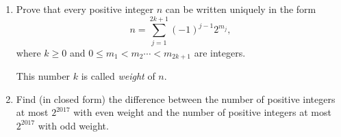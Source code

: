\begin{enumerate}[label=(\alph*)]
	\item Prove that every positive integer $n$ can be written uniquely in the form \[n=\sum_{j=1}^{2k+1}(-1)^{j-1}2^{m_j},\] where $k\geq 0$ and $0\le m_1<m_2\cdots <m_{2k+1}$ are integers.
	
	This number $k$ is called \emph{weight} of $n$.
	
	\item Find (in closed form) the difference between the number of positive integers at most $2^{2017}$ with even weight and the number of positive integers at most $2^{2017}$ with odd weight.
\end{enumerate}